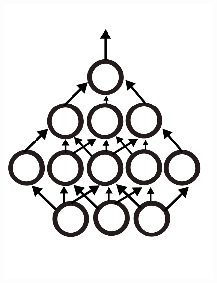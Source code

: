 \begin{figure}[!htb]
  \includegraphics[width=\linewidth]{./Images/Chapter06/mlp.pdf}
\endminipage\hfill
{}

\end{figure}
